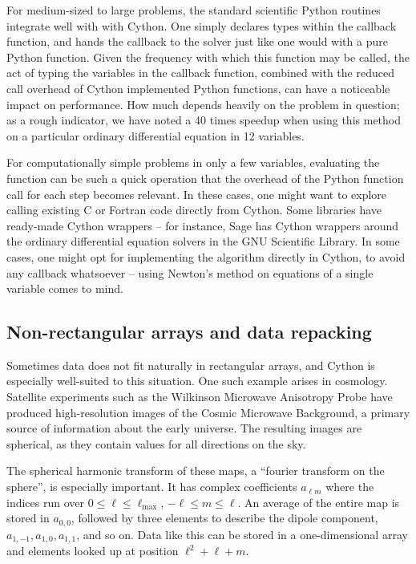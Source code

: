 \documentclass[letterpaper,11pt,english]{article}
\begin{document}
For medium-sized to large problems, the standard scientific Python
routines integrate well with with Cython. One simply declares types
within the callback function, and hands the callback to the solver
just like one would with a pure Python function. Given the frequency
with which this function may be called, the act of typing the
variables in the callback function, combined with the reduced call
overhead of Cython implemented Python functions, can have a noticeable
impact on performance. How much depends heavily on the problem in
question; as a rough indicator, we have noted a 40 times speedup
when using this method on a particular ordinary differential equation
in 12 variables.

For computationally simple problems in only a few variables,
evaluating the function can be such a quick operation that the
overhead of the Python function call for each step becomes
relevant. In these cases, one might want to explore calling existing C
or Fortran code directly from Cython.  Some libraries have ready-made
Cython wrappers -- for instance, Sage has Cython wrappers around the
ordinary differential equation solvers in the GNU Scientific
Library. In some cases, one might opt for implementing the algorithm
directly in Cython, to avoid any callback whatsoever -- using Newton's
method on equations of a single variable comes to mind.


\subsection{Non-rectangular arrays and data repacking}

Sometimes data does not fit naturally in rectangular arrays, and
Cython is especially well-suited to this situation.  One such example
arises in cosmology. Satellite experiments such as the Wilkinson
Microwave Anisotropy Probe have produced high-resolution images of the
Cosmic Microwave Background, a primary source of information about the
early universe. The resulting images are spherical, as they contain
values for all directions on the sky.

The spherical harmonic transform of these maps, a ``fourier transform
on the sphere'', is especially important. It has complex
coefficients $a_{\ell m}$ where the indices run over
$0\le\ell\le\ell_{\mathrm{max}}$, $-\ell \le m \le
\ell$. An average of the entire map is stored in $a_{0,0}$,
followed by three elements to describe the dipole component, $a_{1,-1},
a_{1,0}, a_{1,1}$, and so on.  Data like this can be
stored in a one-dimensional array and elements looked up at position
$\ell^2 + \ell + m$.
\end{document}
